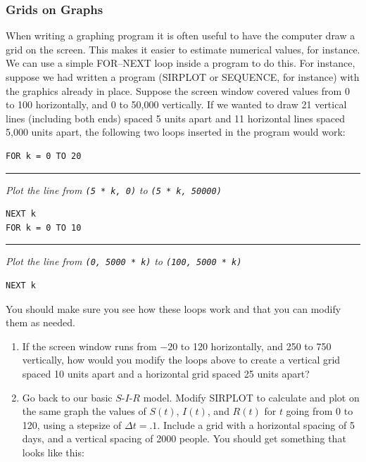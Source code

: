 \subsubsection{Grids on Graphs}
\label{subsubsec:grids-on-graphs}

When writing a graphing program it is often useful to have the
 computer draw a grid on the screen.  This makes it easier to estimate
 numerical values, for instance.  We can use a simple FOR--NEXT loop
 inside a program to do this.  For instance, suppose we had written a
 program (SIRPLOT or SEQUENCE, for instance) with the graphics already
 in place.  Suppose the screen window covered values from 0 to 100
 horizontally, and 0 to 50,000 vertically.  If we wanted to draw 21
 vertical lines (including both ends) spaced 5 units apart and 11
 horizontal lines spaced 5,000 units apart, the following two loops
 inserted in the program would work:



\begin{verbatim}
FOR k = 0 TO 20
\end{verbatim}

\rule{34pt}{0pt} {\sl Plot the line from 
		{\tt (5 * k, 0)}} {\sl to {\tt (5 * k, 50000)}}\\

\begin{verbatim}
NEXT k
FOR k = 0 TO 10
\end{verbatim}

\rule{34pt}{0pt} {\sl Plot the line from 
		{\tt (0, 5000 * k)}} {\sl to {\tt (100, 5000 * k)}}\\

\begin{verbatim}
NEXT k
\end{verbatim}
You should make sure you see how these loops work and that you can
 modify them as needed.


\begin{enumerate}
\item If the screen window runs from $-20$ to 120 horizontally, and 250
 to 750 vertically, how would you modify the loops above to create a
 vertical grid spaced 10 units apart and a horizontal grid spaced 25
 units apart?


\item Go back to our basic $S$-$I$-$R$ model.  Modify SIRPLOT to
 calculate and plot on the same graph the values of $S(t)$, $I(t)$,
 and $R(t)$ for $t$ going from 0 to 120, using a stepsize of $\Delta t
 = .1$.  Include a grid with a horizontal spacing of 5 days, and a
 vertical spacing of 2000 people.  You should get something that looks
 like this:








\end{enumerate}
